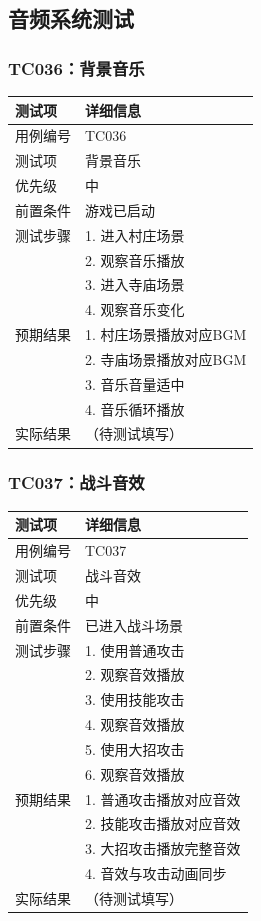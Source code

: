 \documentclass[a4paper,12pt]{article}
\begin{document}
\subsection{音频系统测试}

\subsubsection{TC036：背景音乐}
\begin{table}[h]
\centering
\begin{tabular}{ll}
\toprule
测试项 & 详细信息 \\
\midrule
用例编号 & TC036 \\
测试项 & 背景音乐 \\
优先级 & 中 \\
前置条件 & 游戏已启动 \\
测试步骤 & 1. 进入村庄场景 \\
 & 2. 观察音乐播放 \\
 & 3. 进入寺庙场景 \\
 & 4. 观察音乐变化 \\
预期结果 & 1. 村庄场景播放对应BGM \\
 & 2. 寺庙场景播放对应BGM \\
 & 3. 音乐音量适中 \\
 & 4. 音乐循环播放 \\
实际结果 & （待测试填写） \\
\bottomrule
\end{tabular}
\end{table}

\subsubsection{TC037：战斗音效}
\begin{table}[h]
\centering
\begin{tabular}{ll}
\toprule
测试项 & 详细信息 \\
\midrule
用例编号 & TC037 \\
测试项 & 战斗音效 \\
优先级 & 中 \\
前置条件 & 已进入战斗场景 \\
测试步骤 & 1. 使用普通攻击 \\
 & 2. 观察音效播放 \\
 & 3. 使用技能攻击 \\
 & 4. 观察音效播放 \\
 & 5. 使用大招攻击 \\
 & 6. 观察音效播放 \\
预期结果 & 1. 普通攻击播放对应音效 \\
 & 2. 技能攻击播放对应音效 \\
 & 3. 大招攻击播放完整音效 \\
 & 4. 音效与攻击动画同步 \\
实际结果 & （待测试填写） \\
\bottomrule
\end{tabular}
\end{table}
\end{document}
